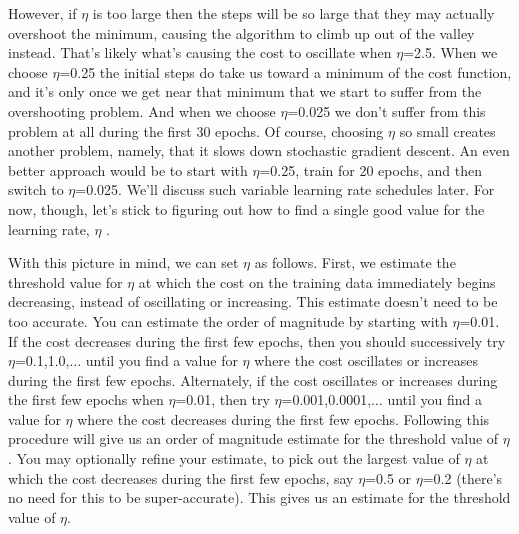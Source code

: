 However, if $\eta$ is too large then the steps will be so large that they may actually overshoot the minimum, causing the algorithm to climb up out of the valley instead. 
That's likely what's causing the cost to oscillate when $\eta$=2.5. When we choose $\eta$=0.25 the initial steps do take us toward a minimum of the cost function, and it's only once we get near that minimum that we start to suffer from the overshooting problem. And when we choose $\eta$=0.025 we don't suffer from this problem at all during the first 30 epochs. Of course, choosing $\eta$ so small creates another problem, namely, that it slows down stochastic gradient descent. An even better approach would be to start with $\eta$=0.25, train for 20 epochs, and then switch to $\eta$=0.025. We'll discuss such variable learning rate schedules later. For now, though, let's stick to figuring out how to find a single good value for the learning rate, $\eta$ .

With this picture in mind, we can set $\eta$ as follows. First, we estimate the threshold value for $\eta$ at which the cost on the training data immediately begins decreasing, instead of oscillating or increasing. This estimate doesn't need to be too accurate. You can estimate the order of magnitude by starting with $\eta$=0.01. If the cost decreases during the first few epochs, then you should successively try $\eta$=0.1,1.0,$\ldots$ until you find a value for $\eta$ where the cost oscillates or increases during the first few epochs. Alternately, if the cost oscillates or increases during the first few epochs when $\eta$=0.01, then try $\eta$=0.001,0.0001,$\ldots$ until you find a value for $\eta$ where the cost decreases during the first few epochs. Following this procedure will give us an order of magnitude estimate for the threshold value of $\eta$. You may optionally refine your estimate, to pick out the largest value of $\eta$ at which the cost decreases during the first few epochs, say $\eta$=0.5 or $\eta$=0.2 (there's no need for this to be super-accurate). This gives us an estimate for the threshold value of $\eta$.


